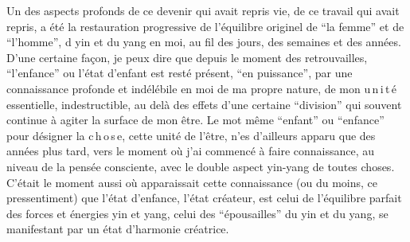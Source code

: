Un des aspects profonds de ce devenir qui avait repris vie, de ce travail qui avait repris, a été la restauration progressive de l'équilibre originel de ``la femme'' et de ``l'homme'', d yin et du yang en moi, au fil des jours, des semaines et des années. D'une certaine façon, je peux dire que depuis le moment des retrouvailles, ``l'enfance'' ou l'état d'enfant est resté présent, ``en puissance'', par une connaissance profonde et indélébile en moi de ma propre nature, de mon u\,n\,i\,t\,é essentielle, indestructible, au delà des effets d'une certaine ``division'' qui souvent continue à agiter la surface de mon être. Le mot même ``enfant'' ou ``enfance'' pour désigner la c\,h\,o\,s\,e, cette unité de l'être, n'es\margin{\unsure{-}}
d'ailleurs apparu que des années plus tard, vers le moment où j'ai commencé à faire connaissance, au niveau de la pensée consciente, avec le double aspect yin-yang de toutes choses. C'était le moment aussi où apparaissait cette connaissance (ou du moins, ce pressentiment) que l'état d'enfance, l'état créateur, est celui de l'équilibre parfait des forces et énergies yin et yang, celui des ``épousailles'' du yin et du yang, se manifestant par un état d'harmonie créatrice.


